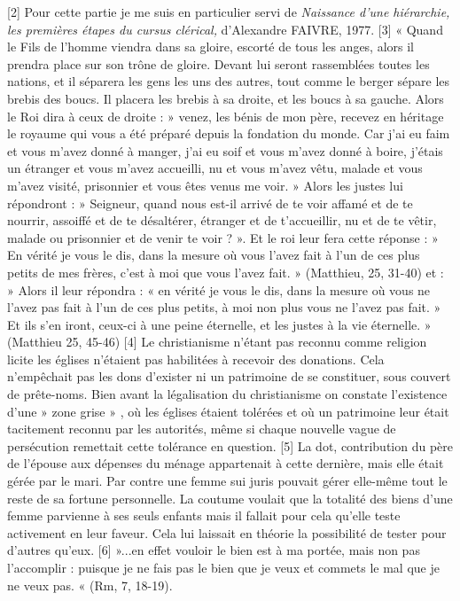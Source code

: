 [2] Pour cette partie je me suis en particulier servi de \emph{Naissance d'une hiérarchie, les premières étapes du cursus clérical,} d'Alexandre FAIVRE, 1977.
[3] « Quand le Fils de l'homme viendra dans sa gloire, escorté de tous les anges, alors il prendra place sur son trône de gloire. Devant lui seront rassemblées toutes les nations, et il séparera les gens les uns des autres, tout comme le berger sépare les brebis des boucs. Il placera les brebis à sa droite, et les boucs à sa gauche. Alors le Roi dira à ceux de droite : » venez, les bénis de mon père, recevez en héritage le royaume qui vous a été préparé depuis la fondation du monde. Car j'ai eu faim et vous m'avez donné à manger, j'ai eu soif et vous m'avez donné à boire, j'étais un étranger et vous m'avez accueilli, nu et vous m'avez vêtu, malade et vous m'avez visité, prisonnier et vous êtes venus me voir. » Alors les justes lui répondront : » Seigneur, quand nous est-il arrivé de te voir affamé et de te nourrir, assoiffé et de te désaltérer, étranger et de t'accueillir, nu et de te vêtir, malade ou prisonnier et de venir te voir ? ». Et le roi leur fera cette réponse : » En vérité je vous le dis, dans la mesure où vous l'avez fait à l'un de ces plus petits de mes frères, c'est à moi que vous l'avez fait. » (Matthieu, 25, 31-40) et : » Alors il leur répondra : « en vérité je vous le dis, dans la mesure où vous ne l'avez pas fait à l'un de ces plus petits, à moi non plus vous ne l'avez pas fait. » Et ils s'en iront, ceux-ci à une peine éternelle, et les justes à la vie éternelle. » (Matthieu 25, 45-46)
[4] Le christianisme n'étant pas reconnu comme religion licite les églises n'étaient pas habilitées à recevoir des donations. Cela n'empêchait pas les dons d'exister ni un patrimoine de se constituer, sous couvert de prête-noms. Bien avant la légalisation du christianisme on constate l'existence d'une » zone grise » , où les églises étaient tolérées et où un patrimoine leur était tacitement reconnu par les autorités, même si chaque nouvelle vague de persécution remettait cette tolérance en question. 
[5] La dot, contribution du père de l'épouse aux dépenses du ménage appartenait à cette dernière, mais elle était gérée par le mari. Par contre une femme sui juris pouvait gérer elle-même tout le reste de sa fortune personnelle. La coutume voulait que la totalité des biens d'une femme parvienne à ses seuls enfants mais il fallait pour cela qu'elle teste activement en leur faveur. Cela lui laissait en théorie la possibilité de tester pour d'autres qu'eux.
[6] »...en effet vouloir le bien est à ma portée, mais non pas l'accomplir : puisque je ne fais pas le bien que je veux et commets le mal que je ne veux pas. « (Rm, 7, 18-19). 
